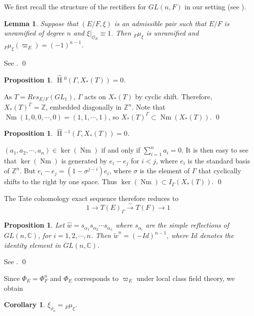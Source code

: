 \documentclass[11pt]{amsart}
\theoremstyle{plain}
\newtheorem{proposition}[theorem]{Proposition}
\newtheorem{corollary}[theorem]{Corollary}
\newtheorem{lemma}[theorem]{Lemma}
\newcommand{\HT}[1]{\hat{\HH}{}^{#1}}
\theoremstyle{definition}
\DeclareMathOperator{\HH}{H}
\DeclareMathOperator{\Nm}{Nm}
\begin{document}
We first recall the structure of the rectifiers for $GL(n,F)$ in our
setting (see \cite{bushnellhenniart}).

\begin{lemma}
  Suppose that $(E/F, \xi)$ is an admissible pair such that $E/F$ is
  unramified of degree $n$ and $\xi|_{\mathcal{O}_E} \equiv 1$.
  Then ${}_F \mu_{\xi}$ is unramified and
  ${}_F \mu_{\xi}(\varpi_E) = (-1)^{n-1}$.
\end{lemma}

\proof
See \cite[Proposition 21]{bushnellhenniart}.
\qed

\begin{proposition}
$\HT{0}(\Gamma, X_*(T)) = 0$.
\end{proposition}

\proof
As $T = Res_{E/F}(GL_1)$, $\Gamma$ acts on $X_*(T)$ by cyclic shift.
Therefore, $X_*(T)^{\Gamma} = \mathbb{Z}$, embedded diagonally in
$\mathbb{Z}^n$.  Note that $\Nm(1,0,0,\cdots,0) = (1,1,\cdots,1)$, so
$X_*(T)^{\Gamma} \subset \Nm(X_*(T))$.
\qed

\begin{proposition}
$\HT{-1}(\Gamma, X_*(T)) = 0$.
\end{proposition}

\proof
$(a_1, a_2, \cdots, a_n) \in \ker(\Nm)$ if and only if $\displaystyle\sum_{i=1}^n a_i = 0$.
It is then easy to see that $\ker(\Nm)$ is generated by $e_i - e_j$ for $i < j$, where
$e_i$ is the standard basis of $\mathbb{Z}^n$.  But $e_i - e_j = (1-\sigma^{j-i}) e_i$,
where $\sigma$ is the element of $\Gamma$ that cyclically shifts to the right by 
one space.  Thus $\ker(\Nm) \subset I_{\Gamma}(X_*(T))$.
\qed

The Tate cohomology exact sequence therefore reduces to 
$$1 \rightarrow T(E)_{\Gamma} \xrightarrow{\sim} T(F) \rightarrow 1$$
\begin{proposition}
Let $\hat{w} = s_{\alpha_1} s_{\alpha_2} \cdots s_{\alpha_n}$ where
$s_{\alpha_i}$ are the simple reflections of $GL(n,\mathbb{C})$,
for $i = 1, 2, \cdots, n$.  Then $\tilde{w}^n = (-Id)^{n-1}$, where $Id$
denotes the identity element in $GL(n,\mathbb{C})$.
\end{proposition}

\proof
See \cite[\S3.1]{zaremsky}.
\qed

Since $\Phi_E = \Phi_F^n$ and $\Phi_E$ corresponds to $\varpi_E$ under local
class field theory, we obtain

\begin{corollary}
$\xi_{\phi_o} = {}_F \mu_{\xi}$.
\end{corollary}
\end{document}
